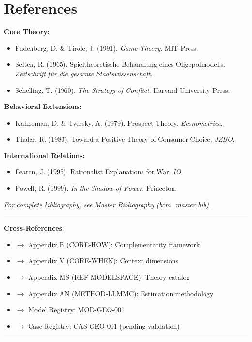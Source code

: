 
\section{References}
\label{sec:crisis-refs}

\textbf{Core Theory:}
\begin{itemize}
\item Fudenberg, D. \& Tirole, J. (1991). \textit{Game Theory}. MIT Press.
\item Selten, R. (1965). Spieltheoretische Behandlung eines Oligopolmodells. \textit{Zeitschrift für die gesamte Staatswissenschaft}.
\item Schelling, T. (1960). \textit{The Strategy of Conflict}. Harvard University Press.
\end{itemize}

\textbf{Behavioral Extensions:}
\begin{itemize}
\item Kahneman, D. \& Tversky, A. (1979). Prospect Theory. \textit{Econometrica}.
\item Thaler, R. (1980). Toward a Positive Theory of Consumer Choice. \textit{JEBO}.
\end{itemize}

\textbf{International Relations:}
\begin{itemize}
\item Fearon, J. (1995). Rationalist Explanations for War. \textit{IO}.
\item Powell, R. (1999). \textit{In the Shadow of Power}. Princeton.
\end{itemize}

\vspace{5mm}
\textit{For complete bibliography, see Master Bibliography (bcm\_master.bib).}

\nocite{bcm_master}



\vspace{10mm}
\hrule
\vspace{3mm}

\textbf{Cross-References:}
\begin{itemize}[nosep]
\item $\rightarrow$ Appendix B (CORE-HOW): Complementarity framework
\item $\rightarrow$ Appendix V (CORE-WHEN): Context dimensions
\item $\rightarrow$ Appendix MS (REF-MODELSPACE): Theory catalog
\item $\rightarrow$ Appendix AN (METHOD-LLMMC): Estimation methodology
\item $\rightarrow$ Model Registry: MOD-GEO-001
\item $\rightarrow$ Case Registry: CAS-GEO-001 (pending validation)
\end{itemize}

\vspace{3mm}
\hrule


